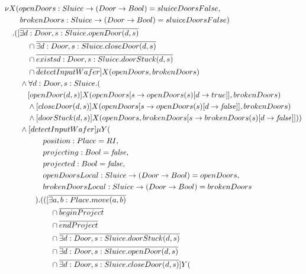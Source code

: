 \begin{description}
\begin{align*}\allowdisplaybreaks
& \nu X(openDoors: Sluice \to (Door \to Bool) = sluiceDoorsFalse, \\
& \tab\tab brokenDoors: Sluice \to (Door \to Bool) = sluiceDoorsFalse) \\
& \tab . ([\overline{\exists d: Door, s: Sluice . openDoor(d, s)} \\
& \tab\tab\tab \cap \overline{\exists d: Door, s: Sluice . closeDoor(d, s)} \\
& \tab\tab\tab \cap \overline{exists d: Door, s: Sluice . doorStuck(d, s)} \\
& \tab\tab\tab \cap \overline{detectInputWafer}]X(openDoors, brokenDoors) \\
& \tab\tab \wedge \forall d: Door, s: Sluice . ( \\
& \tab\tab\tab [openDoor(d, s)]X(openDoors[s \to openDoors(s)[d \to true]], brokenDoors) \\
& \tab\tab\tab \wedge [closeDoor(d, s)]X(openDoors[s \to openDoors(s)[d \to \mathit{false}]], brokenDoors) \\
& \tab\tab\tab \wedge [doorStuck(d, s)]X(openDoors, brokenDoors[s \to brokenDoors(s)[d \to \mathit{false}]])) \\
& \tab\tab \wedge [detectInputWafer]\mu Y( \\ 
& \tab\tab\tab\tab\tab position: Place = RI, \\
& \tab\tab\tab\tab\tab projecting: Bool = \mathit{false}, \\
& \tab\tab\tab\tab\tab projected: Bool = \mathit{false}, \\
& \tab\tab\tab\tab\tab openDoorsLocal: Sluice \to (Door \to Bool) = openDoors, \\
& \tab\tab\tab\tab\tab brokenDoorsLocal: Sluice \to (Door \to Bool) = brokenDoors \\
& \tab\tab\tab\tab ) . (([\overline{\exists a, b: Place . move(a, b)} \\
& \tab\tab\tab\tab\tab\tab \cap \overline{beginProject} \\
& \tab\tab\tab\tab\tab\tab \cap \overline{endProject} \\
& \tab\tab\tab\tab\tab\tab \cap \overline{\exists d: Door, s: Sluice . doorStuck(d, s)} \\
& \tab\tab\tab\tab\tab\tab \cap \overline{\exists d: Door, s: Sluice . openDoor(d, s)} \\
& \tab\tab\tab\tab\tab\tab \cap \overline{\exists d: Door, s: Sluice . closeDoor(d, s)}]Y( \\

\end{align*}
\end{description}

